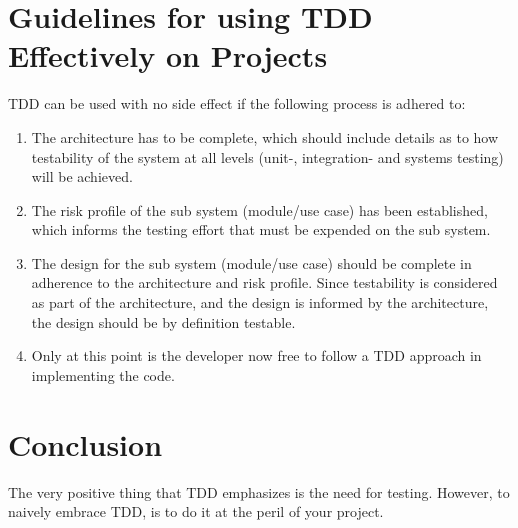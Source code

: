 \documentclass[11pt,final,onecolumn]{amsart}
\begin{document}
  \section{Guidelines for using TDD Effectively on Projects}
  TDD can be used with no side effect if the following process is adhered to:
  \begin{enumerate}
   \item The architecture has to be complete, which should include details as to how testability of the system at all levels (unit-, integration- and systems testing) will be achieved.
   \item The risk profile of the sub system (module/use case) has been established, which informs the testing effort that must be expended on the sub system.
   \item The design for the sub system (module/use case) should be complete in adherence to the architecture and risk profile. Since testability is considered as part of the architecture, and the design is informed by the architecture, the design should be by definition testable.
   \item Only at this point is the developer now free to follow a TDD approach in implementing the code.
  \end{enumerate}
  
  \section{Conclusion}
  The very positive thing that TDD emphasizes is the need for testing. However, to naively embrace TDD, is to do it at the peril of your project.


  
  
  
 
\end{document}
